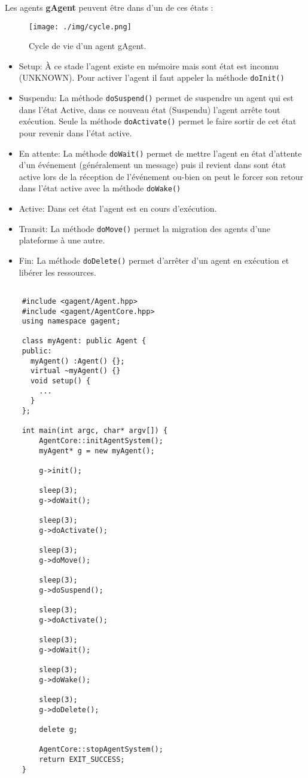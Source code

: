 Les agents \textbf{gAgent} peuvent être dans d'un de ces états :

\begin{figure}[thpb]
  \centering
    \texttt{[image: ./img/cycle.png]}
    \caption{Cycle de vie d'un agent gAgent.}
    \label{cycle_de_vie} 
\end{figure}


\begin{itemize}
 \item Setup: À ce stade l'agent existe en mémoire mais sont état est inconnu (UNKNOWN). Pour activer l'agent il faut appeler la méthode \texttt{doInit()}
 \item Suspendu: La méthode \texttt{doSuspend()} permet de suspendre un agent qui est dans l'état Active, dans ce nouveau état (Suspendu) 
		 l'agent arrête tout exécution. Seule la méthode \texttt{doActivate()} permet le faire sortir de cet état pour revenir dans l'état active.
 \item En attente: La méthode \texttt{doWait()} permet de mettre l'agent en état d'attente d'un événement (généralement un message) puis il revient dans sont état active lors de la réception
		 de l'événement ou-bien on peut le forcer son retour dans l'état active avec la méthode \texttt{doWake()}
 \item Active: Dans cet état l'agent est en cours d'exécution.
 \item Transit: La méthode \texttt{doMove()} permet la migration des agents d'une plateforme à une autre.
 \item Fin: La méthode \texttt{doDelete()} permet d'arrêter d'un agent en exécution et libérer les ressources.
\end{itemize}



\begin{lstlisting}

	#include <gagent/Agent.hpp>
	#include <gagent/AgentCore.hpp>
	using namespace gagent;

	class myAgent: public Agent {
	public:
	  myAgent() :Agent() {};
	  virtual ~myAgent() {}
	  void setup() {
	    ...
	  }
	};
	
	int main(int argc, char* argv[]) {
	    AgentCore::initAgentSystem();
	    myAgent* g = new myAgent();
	    
	    g->init();
	    
	    sleep(3);
	    g->doWait();
	    
	    sleep(3);
	    g->doActivate();
	    
	    sleep(3);
	    g->doMove();
	    
	    sleep(3);
	    g->doSuspend();
	    
	    sleep(3);
	    g->doActivate();
	    
	    sleep(3);
	    g->doWait();
	    
	    sleep(3);
	    g->doWake();
	    
	    sleep(3);
	    g->doDelete();
	    
	    delete g;
	    
	    AgentCore::stopAgentSystem();
	    return EXIT_SUCCESS;
	}
	
\end{lstlisting}

